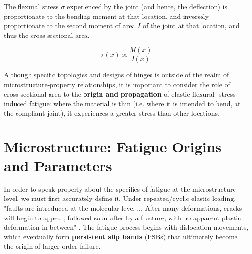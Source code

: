 \documentclass{report}
\newcommand{\myuline}[1]{%
  \uline{\phantom{#1}}%
  \llap{\contour{white}{#1}}%
}
\begin{document}
The flexural stress $\sigma$ experienced by the joint (and hence, the deflection) is 
proportionate to the bending moment at that location, and inversely proportionate to 
the second moment of area $I$ of the joint at that location, and thus the cross-sectional area.

\begin{equation}
    \sigma (x) \propto \frac {M(x)}{I(x)}
\end{equation}

Although specific topologies and designs of hinges is outside of the realm of 
microstructure-property relationships, it is important to consider the role of 
cross-sectional area to the \textbf{origin and propagation} of elastic flexural-
stress-induced fatigue: where the material is thin (i.e. where it is intended to bend, 
at the compliant joint), it experiences a greater stress than other locations.

\section{Microstructure: Fatigue Origins and Parameters}

In order to speak properly about the specifics of fatigue at the microstructure level, 
we must first accurately define it. Under repeated/cyclic elastic loading, "faults are 
introduced at the molecular level ... After many deformations, 
cracks will begin to appear, followed soon after by a fracture, with no apparent plastic 
deformation in between" \cite{fatigue}. The fatigue process begins with dislocation movements, 
which eventually form \textbf{persistent slip bands} (PSBs) that ultimately become the origin 
of larger-order failure.

\end{document}
